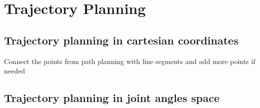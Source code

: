 \section{Trajectory Planning}

\subsection{Trajectory planning in cartesian coordinates}

Connect the points from path planning with line segments and add more points if needed

\subsection{Trajectory planning in joint angles space}